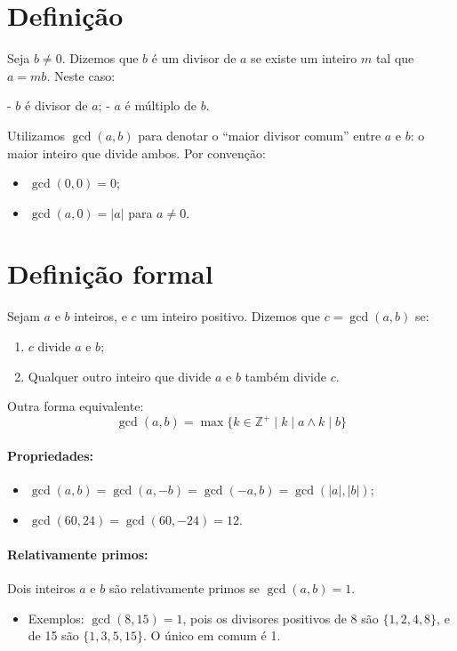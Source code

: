 \documentclass[12pt]{book}
\begin{document}
\section*{Definição}
Seja $b \neq 0$. Dizemos que $b$ é um divisor de $a$ se existe um inteiro $m$ tal que $a = mb$. Neste caso:

- $b$ é divisor de $a$;
- $a$ é múltiplo de $b$.

Utilizamos $\gcd(a, b)$ para denotar o “maior divisor comum” entre $a$ e $b$: o maior inteiro que divide ambos. Por convenção:
\begin{itemize}
  \item $\gcd(0, 0) = 0$;
  \item $\gcd(a, 0) = |a|$ para $a \neq 0$.
\end{itemize}

\section*{Definição formal}
Sejam $a$ e $b$ inteiros, e $c$ um inteiro positivo. Dizemos que $c = \gcd(a, b)$ se:
\begin{enumerate}
  \item $c$ divide $a$ e $b$;
  \item Qualquer outro inteiro que divide $a$ e $b$ também divide $c$.
\end{enumerate}

Outra forma equivalente:
\[
\gcd(a, b) = \max\{k \in \mathbb{Z}^+ \mid k \mid a \land k \mid b\}
\]

\paragraph{Propriedades:}
\begin{itemize}
  \item $\gcd(a, b) = \gcd(a, -b) = \gcd(-a, b) = \gcd(|a|, |b|)$;
  \item $\gcd(60, 24) = \gcd(60, -24) = 12$.
\end{itemize}

\paragraph{Relativamente primos:} Dois inteiros $a$ e $b$ são relativamente primos se $\gcd(a, b) = 1$.
\begin{itemize}
  \item Exemplos: $\gcd(8, 15) = 1$, pois os divisores positivos de 8 são $\{1,2,4,8\}$, e de 15 são $\{1,3,5,15\}$. O único em comum é 1.
\end{itemize}
\end{document}
